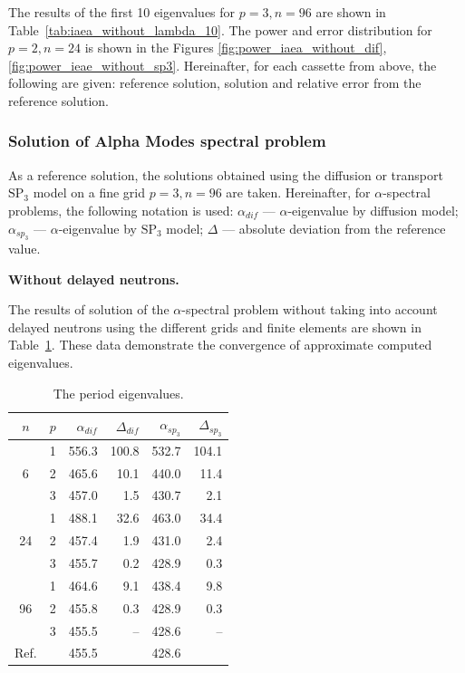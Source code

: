 \documentclass[authoryear]{elsarticle}
\begin{document}
The results of the first 10 eigenvalues for $ p = 3, n = 96 $ are shown in Table~\ref{tab:iaea_without_lambda_10}.
The power and error distribution for $p = 2, n = 24$ is shown in the Figures \ref{fig:power_iaea_without_dif}, \ref{fig:power_ieae_without_sp3}.
Hereinafter, for each cassette from above, the following are given: reference solution, solution and relative error from the reference solution.

\subsubsection{Solution of Alpha Modes spectral problem}
As a reference solution, the solutions obtained using the diffusion or transport $\mathrm{SP_3}$ model on a fine grid $ p = 3, n = 96 $ are taken.
Hereinafter, for $\alpha$-spectral problems, the following notation is used: $\alpha_{dif}$ --- $\alpha$-eigenvalue by diffusion model; $\alpha_{sp_3}$ --- $\alpha$-eigenvalue by $\mathrm{SP_3}$ model; $\Delta$ --- absolute deviation from the reference value.

\textbf{Without delayed neutrons.}

The results of solution of the $\alpha$-spectral problem without taking into account delayed neutrons using the different grids and finite elements are shown in Table~\ref{tab:iaea_without_alpha}.
These data demonstrate the convergence of approximate computed eigenvalues.

\begin{table}[hp]
\caption{The period eigenvalues.}
\label{tab:iaea_without_alpha}
\begin{center}
\begin{tabular}{c c r r r r}
\hline
$n$ & $p$ & $\alpha_{dif}$ & $\Delta_{dif}$ &$\alpha_{sp_3}$& $\Delta_{sp_3}$ \\
\hline
	& 1	& 556.3 & 100.8 & 532.7 & 104.1\\
6	& 2	& 465.6 & 10.1 & 440.0 & 11.4\\
	& 3	& 457.0 &  1.5 & 430.7 & 2.1\\ 
\hline
	& 1	& 488.1 & 32.6 & 463.0 & 34.4\\
24& 2	& 457.4 & 1.9 & 431.0 & 2.4\\
	& 3	& 455.7 & 0.2 & 428.9 & 0.3\\ 
\hline
	& 1	& 464.6 & 9.1 & 438.4 & 9.8\\
96& 2	& 455.8 & 0.3 & 428.9 & 0.3\\
	& 3	& 455.5 & -- & 428.6 & -- \\ 
\hline
Ref.& & 455.5 & & 428.6 \\ 
\hline
\end{tabular}
\end{center}
\end{table}
\end{document}

